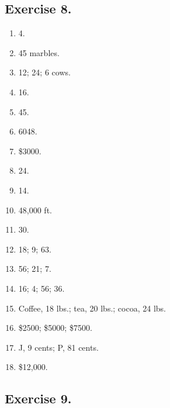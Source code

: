 \documentclass{book}
\begin{document}
\subsection*{Exercise 8.}
\begin{enumerate}
\item 4.

\item 45 marbles.

\item 12; 24; 6 cows.

\item 16.

\item 45.

\item 6048.

\item \$3000.

\item 24.

\item 14.

\item 48,000 ft.

\item 30.

\item 18; 9; 63.

\item 56; 21; 7.

\item 16; 4; 56; 36.

\item Coffee, 18 lbs.; tea, 20 lbs.; cocoa, 24 lbs.

\item \$2500; \$5000; \$7500.

\item J, 9 cents; P, 81 cents.

\item \$12,000.
\end{enumerate}

\subsection*{Exercise 9.}
\end{document}
